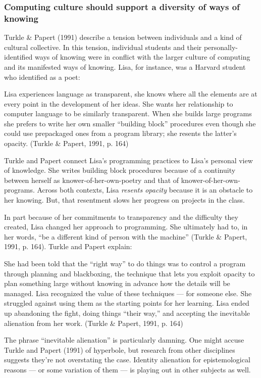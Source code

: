 \subsubsection{Computing culture should support a diversity of ways of
knowing}\label{computing-culture-should-support-a-diversity-of-ways-of-knowing}

Turkle \& Papert (1991) describe a tension between individuals and a
kind of cultural collective. In this tension, individual students and
their personally-identified ways of knowing were in conflict with the
larger culture of computing and its manifested ways of knowing. Lisa,
for instance, was a Harvard student who identified as a poet:

Lisa experiences language as transparent, she knows where all the
elements are at every point in the development of her ideas. She wants
her relationship to computer language to be similarly transparent. When
she builds large programs she prefers to write her own smaller
``building block'' procedures even though she could use prepackaged ones
from a program library; she resents the latter's opacity. (Turkle \&
Papert, 1991, p. 164)

Turkle and Papert connect Lisa's programming practices to Lisa's
personal view of knowledge. She writes building block procedures because
of a continuity between herself as knower-of-her-own-poetry and that of
knower-of-her-own-programs. Across both contexts, Lisa \emph{resents
opacity} because it is an obstacle to her knowing. But, that resentment
slows her progress on projects in the class.

In part because of her commitments to transparency and the difficulty
they created, Lisa changed her approach to programming. She ultimately
had to, in her words, ``be a different kind of person with the machine''
(Turkle \& Papert, 1991, p. 164). Turkle and Papert explain:

She had been told that the ``right way'' to do things was to control a
program through planning and black­boxing, the technique that lets you
exploit opacity to plan something large without knowing in advance how
the details will be managed. Lisa recognized the value of these
techniques --- for someone else. She struggled against using them as the
starting points for her learning. Lisa ended up abandoning the fight,
doing things ``their way,'' and accepting the inevitable alienation from
her work. (Turkle \& Papert, 1991, p. 164)

The phrase ``inevitable alienation'' is particularly damning. One might
accuse Turkle and Papert (1991) of hyperbole, but research from other
disciplines suggests they're not overstating the case. Identity
alienation for epistemological reasons --- or some variation of them ---
is playing out in other subjects as well.

